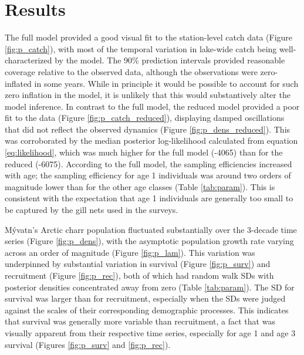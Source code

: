 \documentclass[11pt]{article}
\begin{document}

\section*{Results}

The full model provided a good visual fit to the station-level 
catch data (Figure \ref{fig:p_catch}),
with most of the temporal variation in lake-wide catch being well-characterized by the model.
The 90\% prediction intervals provided reasonable coverage relative to the observed data,
although the observations were zero-inflated in some years.
While in principle it would be possible to account for such zero inflation in the model,
it is unlikely that this would substantively alter the model inference.
In contrast to the full model,
the reduced model provided a poor fit to the data (Figure \ref{fig:p_catch_reduced}),
displaying damped oscillations that did not reflect the observed dynamics
(Figure \ref{fig:p_dens_reduced}).
This was corroborated by the median posterior log-likelihood calculated
from equation \ref{eq:likelihood},
which was much higher for the full model (-4065) than for the reduced (-6075).
According to the full model, 
the sampling efficiencies increased with age;
the sampling efficiency for age 1 individuals was around two orders of magnitude lower
than for the other age classes (Table \ref{tab:param}). 
This is consistent with the expectation that age 1 individuals 
are generally too small to be captured by the gill nets used in the surveys.

M\'{y}vatn's Arctic charr population fluctuated substantially over the 3-decade time series
(Figure \ref{fig:p_dens}), 
with the asymptotic population growth rate varying across an order of magnitude 
(Figure \ref{fig:p_lam}).
This variation was underpinned by substantial variation in survival 
(Figure \ref{fig:p_surv}) 
and recruitment (Figure \ref{fig:p_rec}),
both of which had random walk SDs 
with posterior densities concentrated away from zero (Table \ref{tab:param}).
The SD for survival was larger than for recruitment,
especially when the SDs were judged against the scales of their corresponding 
demographic processes. 
This indicates that survival was generally more variable than recruitment,
a fact that was visually apparent from their respective time series,
especially for age 1 and age 3 survival
(Figures \ref{fig:p_surv} and \ref{fig:p_rec}).
\end{document}
